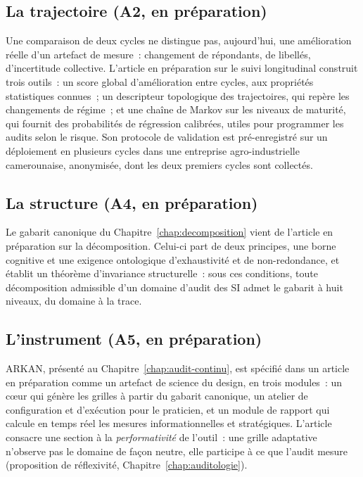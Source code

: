 \subsection{La trajectoire (A2, en préparation)}

Une comparaison de deux cycles ne distingue pas, aujourd'hui, une
amélioration réelle d'un artefact de mesure~: changement de répondants,
de libellés, d'incertitude collective. L'article en préparation sur le
suivi longitudinal construit trois outils~: un score global
d'amélioration entre cycles, aux propriétés statistiques connues~; un
descripteur topologique des trajectoires, qui repère les changements de
régime~; et une chaîne de Markov sur les niveaux de maturité, qui fournit
des probabilités de régression calibrées, utiles pour programmer les
audits selon le risque. Son protocole de validation est pré-enregistré sur
un déploiement en plusieurs cycles dans une entreprise agro-industrielle
camerounaise, anonymisée, dont les deux premiers cycles sont collectés.

\subsection{La structure (A4, en préparation)}

Le gabarit canonique du Chapitre~\ref{chap:decomposition} vient de
l'article en préparation sur la décomposition. Celui-ci part de deux
principes, une borne cognitive et une exigence ontologique
d'exhaustivité et de non-redondance, et établit un théorème
d'invariance structurelle~: sous ces conditions, toute décomposition
admissible d'un domaine d'audit des SI admet le gabarit à huit niveaux,
du domaine à la trace.

\subsection{L'instrument (A5, en préparation)}

ARKAN, présenté au Chapitre~\ref{chap:audit-continu}, est spécifié dans un
article en préparation comme un artefact de science du design, en trois
modules~: un cœur qui génère les grilles à partir du gabarit canonique, un
atelier de configuration et d'exécution pour le praticien, et un module de
rapport qui calcule en temps réel les mesures informationnelles et
stratégiques. L'article consacre une section à la \emph{performativité}
de l'outil~: une grille adaptative n'observe pas le domaine de façon
neutre, elle participe à ce que l'audit mesure (proposition de
réflexivité, Chapitre~\ref{chap:auditologie}).

